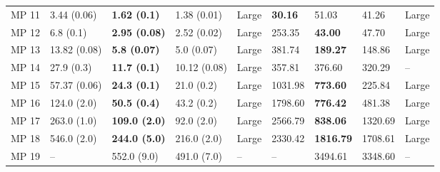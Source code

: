 \begin{tabular}{lllllllll}
MP 11 &        3.44 (0.06) &   \textbf{1.62 (0.1)} &        1.38 (0.01) &       Large &          \textbf{30.16} &                       51.03 &                    41.26 &       Large \\
MP 12 &          6.8 (0.1) &  \textbf{2.95 (0.08)} &        2.52 (0.02) &       Large &                  253.35 &              \textbf{43.00} &                    47.70 &       Large \\
MP 13 &       13.82 (0.08) &   \textbf{5.8 (0.07)} &         5.0 (0.07) &       Large &                  381.74 &             \textbf{189.27} &                   148.86 &       Large \\
MP 14 &         27.9 (0.3) &   \textbf{11.7 (0.1)} &       10.12 (0.08) &       Large &                  357.81 &                      376.60 &                   320.29 &          -- \\
MP 15 &       57.37 (0.06) &   \textbf{24.3 (0.1)} &         21.0 (0.2) &       Large &                 1031.98 &             \textbf{773.60} &                   225.84 &       Large \\
MP 16 &        124.0 (2.0) &   \textbf{50.5 (0.4)} &         43.2 (0.2) &       Large &                 1798.60 &             \textbf{776.42} &                   481.38 &       Large \\
MP 17 &        263.0 (1.0) &  \textbf{109.0 (2.0)} &         92.0 (2.0) &       Large &                 2566.79 &             \textbf{838.06} &                  1320.69 &       Large \\
MP 18 &        546.0 (2.0) &  \textbf{244.0 (5.0)} &        216.0 (2.0) &       Large &                 2330.42 &            \textbf{1816.79} &                  1708.61 &       Large \\
MP 19 &                 -- &           552.0 (9.0) &        491.0 (7.0) &          -- &                      -- &                     3494.61 &                  3348.60 &          -- \\
\bottomrule
\end{tabular}
